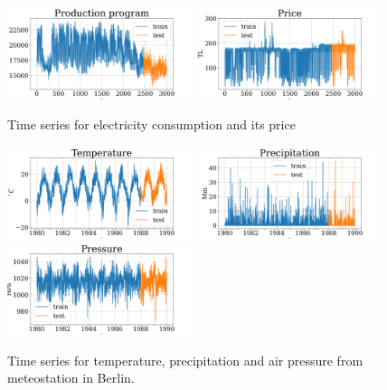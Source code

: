 \documentclass[referee, pdflatex]{sn-jnl}
\theoremstyle{definition}
\theoremstyle{plain}
\begin{document}
	\begin{figure}[h]
		\centering
		\includegraphics[width=0.48\textwidth, keepaspectratio]{../../figs/Electricity_Production}
		\includegraphics[width=0.48\textwidth, keepaspectratio]{../../figs/Electricity_Price}
		\caption{Time series for electricity consumption and its price}\label{fig:electr_data}
	\end{figure}
	
	\begin{figure}[h]
		\centering
		\includegraphics[width=0.48\textwidth, keepaspectratio]{../../figs/Temperature.png}
		\includegraphics[width=0.48\textwidth, keepaspectratio]{../../figs/Precipitation.png}
		\includegraphics[width=0.48\textwidth, keepaspectratio]{../../figs/Pressure.png}
		\caption{Time series for temperature, precipitation and air pressure from meteostation in Berlin.}\label{fig:weather_data}
	\end{figure}
	
\end{document}
